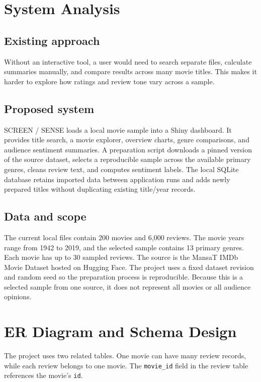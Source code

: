 \documentclass[12pt,a4paper]{report}
\begin{document}
\chapter{System Analysis}
\section{Existing approach}
Without an interactive tool, a user would need to search separate files, calculate summaries manually, and compare results across many movie titles. This makes it harder to explore how ratings and review tone vary across a sample.

\section{Proposed system}
SCREEN / SENSE loads a local movie sample into a Shiny dashboard. It provides title search, a movie explorer, overview charts, genre comparisons, and audience sentiment summaries. A preparation script downloads a pinned version of the source dataset, selects a reproducible sample across the available primary genres, cleans review text, and computes sentiment labels. The local SQLite database retains imported data between application runs and adds newly prepared titles without duplicating existing title/year records.

\section{Data and scope}
The current local files contain 200 movies and 6,000 reviews. The movie years range from 1942 to 2019, and the selected sample contains 13 primary genres. Each movie has up to 30 sampled reviews. The source is the MansaT IMDb Movie Dataset hosted on Hugging Face. The project uses a fixed dataset revision and random seed so the preparation process is reproducible. Because this is a selected sample from one source, it does not represent all movies or all audience opinions.

\chapter{ER Diagram and Schema Design}
The project uses two related tables. One movie can have many review records, while each review belongs to one movie. The \texttt{movie\_id} field in the review table references the movie's \texttt{id}.
\end{document}
